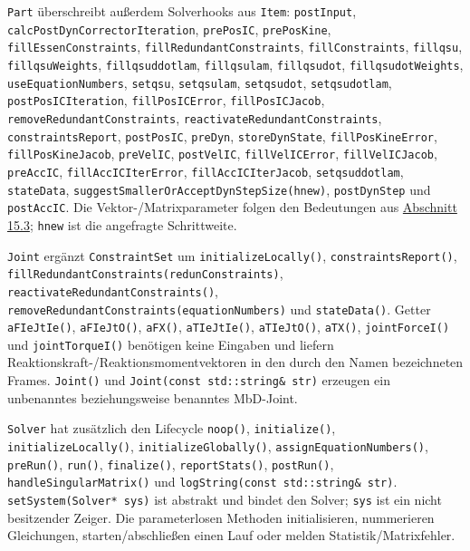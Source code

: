 \documentclass[
  12pt
]{book}
\begin{document}
\texttt{Part} überschreibt außerdem Solverhooks aus \texttt{Item}:
\texttt{postInput}, \texttt{calcPostDynCorrectorIteration},
\texttt{prePosIC}, \texttt{prePosKine}, \texttt{fillEssenConstraints},
\texttt{fillRedundantConstraints}, \texttt{fillConstraints},
\texttt{fillqsu}, \texttt{fillqsuWeights}, \texttt{fillqsuddotlam},
\texttt{fillqsulam}, \texttt{fillqsudot}, \texttt{fillqsudotWeights},
\texttt{useEquationNumbers}, \texttt{setqsu}, \texttt{setqsulam},
\texttt{setqsudot}, \texttt{setqsudotlam}, \texttt{postPosICIteration},
\texttt{fillPosICError}, \texttt{fillPosICJacob},
\texttt{removeRedundantConstraints},
\texttt{reactivateRedundantConstraints}, \texttt{constraintsReport},
\texttt{postPosIC}, \texttt{preDyn}, \texttt{storeDynState},
\texttt{fillPosKineError}, \texttt{fillPosKineJacob}, \texttt{preVelIC},
\texttt{postVelIC}, \texttt{fillVelICError}, \texttt{fillVelICJacob},
\texttt{preAccIC}, \texttt{fillAccICIterError},
\texttt{fillAccICIterJacob}, \texttt{setqsuddotlam}, \texttt{stateData},
\texttt{suggestSmallerOrAcceptDynStepSize(hnew)}, \texttt{postDynStep}
und \texttt{postAccIC}. Die Vektor-/Matrixparameter folgen den
Bedeutungen aus
\protect\hyperlink{abs-api-gemeinsame-funktionen}{Abschnitt 15.3};
\texttt{hnew} ist die angefragte Schrittweite.

\texttt{Joint} ergänzt \texttt{ConstraintSet} um
\texttt{initializeLocally()}, \texttt{constraintsReport()},
\texttt{fillRedundantConstraints(redunConstraints)},
\texttt{reactivateRedundantConstraints()},
\texttt{removeRedundantConstraints(equationNumbers)} und
\texttt{stateData()}. Getter \texttt{aFIeJtIe()}, \texttt{aFIeJtO()},
\texttt{aFX()}, \texttt{aTIeJtIe()}, \texttt{aTIeJtO()}, \texttt{aTX()},
\texttt{jointForceI()} und \texttt{jointTorqueI()} benötigen keine
Eingaben und liefern Reaktionskraft-/Reaktionsmomentvektoren in den
durch den Namen bezeichneten Frames. \texttt{Joint()} und
\texttt{Joint(const\ std::string\&\ str)} erzeugen ein unbenanntes
beziehungsweise benanntes MbD-Joint.

\texttt{Solver} hat zusätzlich den Lifecycle \texttt{noop()},
\texttt{initialize()}, \texttt{initializeLocally()},
\texttt{initializeGlobally()}, \texttt{assignEquationNumbers()},
\texttt{preRun()}, \texttt{run()}, \texttt{finalize()},
\texttt{reportStats()}, \texttt{postRun()},
\texttt{handleSingularMatrix()} und
\texttt{logString(const\ std::string\&\ str)}.
\texttt{setSystem(Solver*\ sys)} ist abstrakt und bindet den Solver;
\texttt{sys} ist ein nicht besitzender Zeiger. Die parameterlosen
Methoden initialisieren, nummerieren Gleichungen, starten/abschließen
einen Lauf oder melden Statistik/Matrixfehler.
\end{document}
